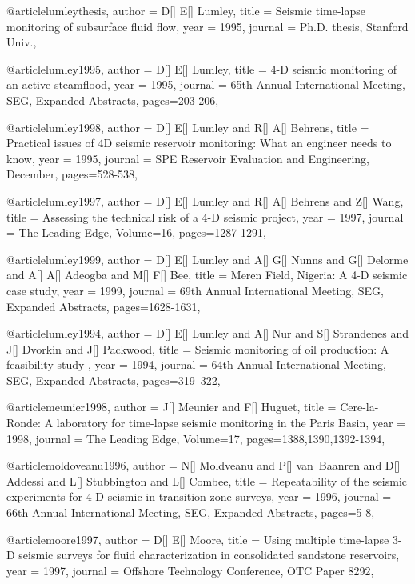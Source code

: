 @article{lumleythesis,
  author =	 {D[] E[] Lumley},
  title =	 {Seismic time-lapse monitoring of subsurface fluid
flow},
  year =	 1995,
  journal =	 {Ph.D. thesis, Stanford Univ.},
}

@article{lumley1995,
  author =	 {D[] E[] Lumley},
  title =	 { 4-D seismic monitoring of an active steamflood},
  year =	 1995,
  journal =	 {65th Annual International Meeting, SEG, Expanded Abstracts},
 pages=203-206,
}

@article{lumley1998,
  author =	 {D[] E[] Lumley and R[] A[] Behrens},
  title =	 { Practical issues of 4D seismic reservoir monitoring: What an engineer needs to know},
  year =	 1995,
  journal =	 {SPE Reservoir Evaluation and Engineering, December},
 pages=528-538,
}

@article{lumley1997,
  author =	 {D[] E[] Lumley and R[] A[] Behrens and Z[] Wang},
  title =	 {Assessing the technical risk of a 4-D seismic project},
  year =	 1997,
  journal =	 {The Leading Edge},
    Volume=16,
 pages=1287-1291,
}

@article{lumley1999,
  author =	 {D[] E[] Lumley and A[] G[] Nunns and G[] Delorme and A[] A[] Adeogba and M[] F[] Bee},
  title =	 {Meren Field, Nigeria: A 4-D seismic case study},
  year =	 1999,
  journal =	 {69th Annual International Meeting, SEG, Expanded Abstracts},
 pages=1628-1631,
}


@article{lumley1994,
  author =	 {D[] E[] Lumley and A[] Nur and S[] Strandenes and J[] Dvorkin and J[] Packwood},
  title =	 {Seismic monitoring of oil production: A feasibility study
},
  year =	 1994,
  journal =	 {64th Annual International Meeting, SEG, Expanded Abstracts},
 pages=319–322,
}

@article{meunier1998,
  author =	 {J[] Meunier and F[] Huguet},
  title =	 {Cere-la-Ronde: A laboratory for time-lapse seismic monitoring in the Paris Basin},
  year =	 1998,
  journal =	 {The Leading Edge},
    Volume=17,
 pages=1388,1390,1392-1394,
}

@article{moldoveanu1996,
  author =	 {N[] Moldveanu and P[] van~Baanren and D[] Addessi and L[] Stubbington and L[] Combee},
  title =	 {Repeatability of the seismic experiments for 4-D
seismic in transition zone surveys},
  year =	 1996,
  journal =	 {66th Annual International Meeting, SEG, Expanded Abstracts},
 pages=5-8,
}


@article{moore1997,
  author =	 {D[] E[] Moore},
  title =	 {Using multiple time-lapse 3-D seismic surveys for
fluid characterization in consolidated sandstone reservoirs},
  year =	 1997,
  journal =	 {Offshore Technology Conference, OTC Paper 8292},
}

